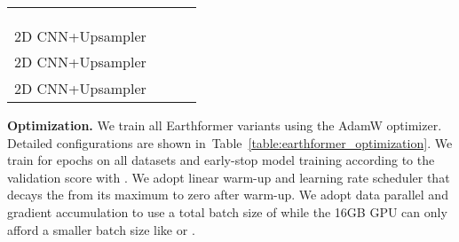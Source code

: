 \documentclass{article}
\newcommand{\tabref}[1]{Table~\ref{#1}}
\renewcommand{\paragraph}[1]{\textbf{#1. }}
\begin{document}
\begin{table}[!tb]
\begin{center}
{\begin{tabular}{l|l|c|c}
                                                        &   &                  &              \\
                                                        &             &                       &              \\
                                                        &       &                       &              \\\hline                                                
	\multirow{4}{*}{2D CNN+Upsampler}                   &   &  &      \\
	                                                    &    &                       &              \\
                                                        &     &                       &              \\
                                                        &       &                       &              \\\hline
    \multirow{4}{*}{2D CNN+Upsampler}                   &   &  &    \\
                                                        &    &                     & \\
                                                        &     &                     &               \\
                                                        &       &                     &               \\\hline
    \multirow{5}{*}{2D CNN+Upsampler}                   &   &  &   \\
                                                        &    &                     &  \\
                                                        &     &                     &               \\
                                                        &       &                     &               \\
                                                        &          &                     &   \\
	\bottomrule[1.5pt]
	\end{tabular}
	}  \end{center}
\end{table}





\paragraph{Optimization}
We train all Earthformer variants using the AdamW optimizer. Detailed configurations are shown in~\tabref{table:earthformer_optimization}. We train for  epochs on all datasets and early-stop model training according to the validation score with . We adopt  linear warm-up and  learning rate scheduler that decays the  from its maximum to zero after warm-up. We adopt data parallel and gradient accumulation to use a total batch size of  while the 16GB GPU can only afford a smaller batch size like  or .
\end{document}
